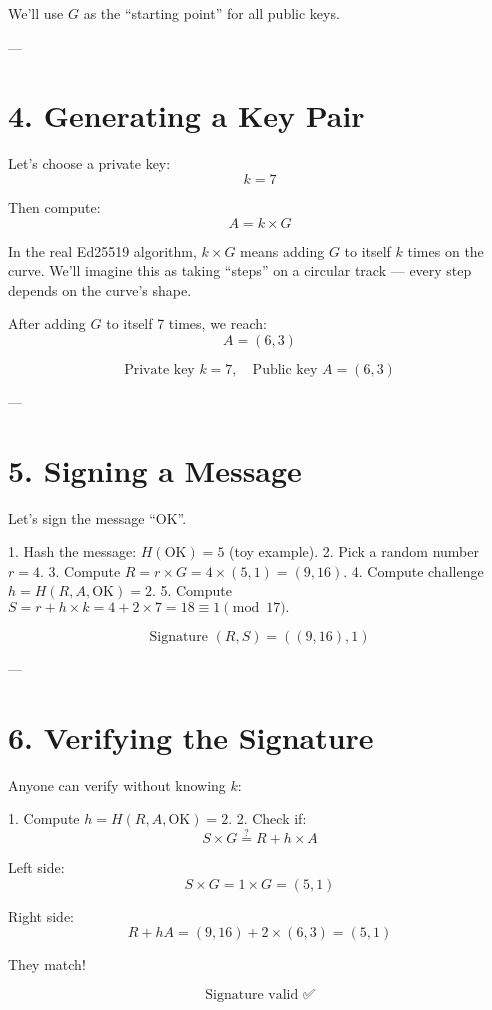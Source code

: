 \documentclass[12pt]{article}
\begin{document}
We’ll use \( G \) as the “starting point” for all public keys.

---

\section*{4. Generating a Key Pair}

Let’s choose a private key:
\[
k = 7
\]

Then compute:
\[
A = k \times G
\]

In the real Ed25519 algorithm, \( k \times G \) means adding \( G \) to itself \( k \) times on the curve.
We’ll imagine this as taking “steps” on a circular track — every step depends on the curve’s shape.

After adding \( G \) to itself 7 times, we reach:
\[
A = (6, 3)
\]

\[
\boxed{\text{Private key } k = 7, \quad \text{Public key } A = (6, 3)}
\]

---

\section*{5. Signing a Message}

Let’s sign the message “OK”.

1. Hash the message: \( H(\text{OK}) = 5 \) (toy example).  
2. Pick a random number \( r = 4 \).  
3. Compute \( R = r \times G = 4 \times (5,1) = (9, 16) \).  
4. Compute challenge \( h = H(R, A, \text{OK}) = 2 \).  
5. Compute \( S = r + h \times k = 4 + 2 \times 7 = 18 \equiv 1 \pmod{17}. \)

\[
\boxed{\text{Signature } (R, S) = ((9, 16), 1)}
\]

---

\section*{6. Verifying the Signature}

Anyone can verify without knowing \( k \):

1. Compute \( h = H(R, A, \text{OK}) = 2 \).  
2. Check if:
\[
S \times G \stackrel{?}{=} R + h \times A
\]

Left side:
\[
S \times G = 1 \times G = (5,1)
\]

Right side:
\[
R + hA = (9,16) + 2 \times (6,3) = (5,1)
\]

They match!

\[
\boxed{\text{Signature valid ✅}}
\]
\end{document}
